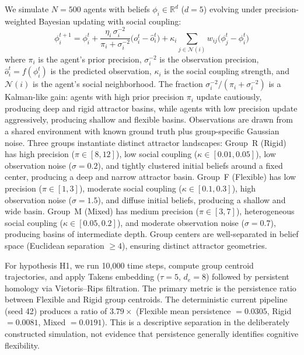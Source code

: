 \documentclass[11pt,a4paper]{article}
\theoremstyle{definition}
\newcommand{\R}{\mathbb{R}}
\begin{document}
We simulate $N = 500$ agents with beliefs $\phi_i \in \R^d$ ($d = 5$) evolving under precision-weighted Bayesian updating with social coupling:
\begin{equation}
  \phi_i^{t+1} = \phi_i^t + \frac{\eta_i \, \sigma_i^{-2}}{\pi_i + \sigma_i^{-2}} \bigl(o_i^t - \hat{o}_i^t\bigr) + \kappa_i \sum_{j \in \mathcal{N}(i)} w_{ij} \bigl(\phi_j^t - \phi_i^t\bigr)
  \label{eq:agent_update}
\end{equation}
where $\pi_i$ is the agent's prior precision, $\sigma_i^{-2}$ is the observation precision, $\hat{o}_i^t = f(\phi_i^t)$ is the predicted observation, $\kappa_i$ is the social coupling strength, and $\mathcal{N}(i)$ is the agent's social neighborhood. The fraction $\sigma_i^{-2}/(\pi_i + \sigma_i^{-2})$ is a Kalman-like gain: agents with high prior precision $\pi_i$ update cautiously, producing deep and rigid attractor basins, while agents with low precision update aggressively, producing shallow and flexible basins. Observations are drawn from a shared environment with known ground truth plus group-specific Gaussian noise. Three groups instantiate distinct attractor landscapes: Group~R (Rigid) has high precision ($\pi \in [8, 12]$), low social coupling ($\kappa \in [0.01, 0.05]$), low observation noise ($\sigma = 0.2$), and tightly clustered initial beliefs around a fixed center, producing a deep and narrow attractor basin. Group~F (Flexible) has low precision ($\pi \in [1, 3]$), moderate social coupling ($\kappa \in [0.1, 0.3]$), high observation noise ($\sigma = 1.5$), and diffuse initial beliefs, producing a shallow and wide basin. Group~M (Mixed) has medium precision ($\pi \in [3, 7]$), heterogeneous social coupling ($\kappa \in [0.05, 0.2]$), and moderate observation noise ($\sigma = 0.7$), producing basins of intermediate depth. Group centers are well-separated in belief space (Euclidean separation $\geq 4$), ensuring distinct attractor geometries.

For hypothesis H1, we run 10{,}000 time steps, compute group centroid trajectories, and apply Takens embedding ($\tau = 5$, $d_e = 8$) followed by persistent homology via Vietoris--Rips filtration. The primary metric is the persistence ratio between Flexible and Rigid group centroids. The deterministic current pipeline (seed 42) produces a ratio of $3.79\times$ (Flexible mean persistence $= 0.0305$, Rigid $= 0.0081$, Mixed $= 0.0191$). This is a descriptive separation in the deliberately constructed simulation, not evidence that persistence generally identifies cognitive flexibility.
\end{document}
